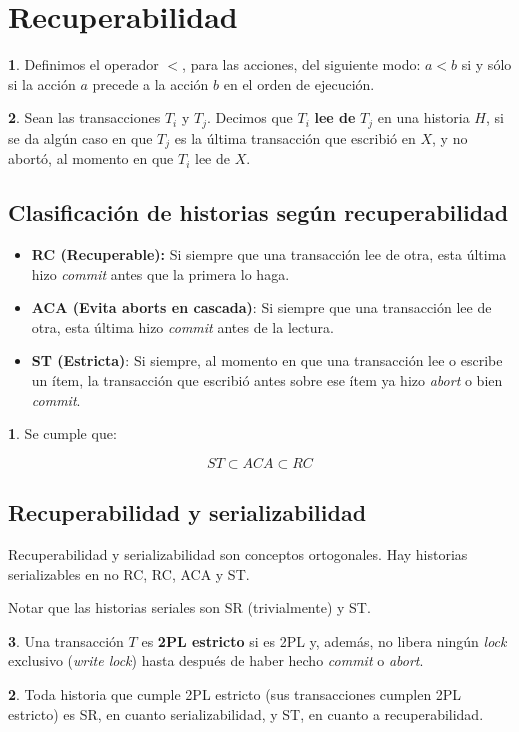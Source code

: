 \documentclass[english,titlepage]{article}
\theoremstyle{definition}
\theoremstyle{definition}
\newtheorem*{defn*}{\protect\definitionname}
\providecommand{\definitionname}{Definición}
\newtheorem*{thm*}{\protect\theoremname}
\providecommand{\theoremname}{Teorema}
\begin{document}
\section{Recuperabilidad}

\begin{defn*}
Definimos el operador $<$, para las acciones, del siguiente modo:
$a < b$ si y sólo si la acción $a$ precede a la acción $b$ en el orden de
ejecución.
\end{defn*}

\begin{defn*}
Sean las transacciones $T_i$ y $T_j$. Decimos que $T_i$ \textbf{lee de} $T_j$
en una historia $H$, si se da algún caso en que $T_j$ es la última transacción
que escribió en $X$, y no abortó, al momento en que $T_i$ lee de $X$.
\end{defn*}

\subsection{Clasificación de historias según recuperabilidad}
\begin{itemize}
	\item \textbf{RC (Recuperable):} Si siempre que una transacción lee de
        otra, esta última hizo \emph{commit} antes que la primera lo haga.
    \item \textbf{ACA (Evita aborts en cascada)}: Si siempre que una
        transacción lee de otra, esta última hizo \emph{commit} antes de la
        lectura.
    \item \textbf{ST (Estricta)}: Si siempre, al momento en que una
        transacción lee o escribe un ítem, la transacción que escribió antes
        sobre ese ítem ya hizo \emph{abort} o bien \emph{commit}.
\end{itemize}

\begin{thm*}
Se cumple que:

$$ ST \subset ACA \subset RC$$
\end{thm*}

\subsection{Recuperabilidad y serializabilidad}

Recuperabilidad y serializabilidad son conceptos ortogonales. Hay historias
serializables en no RC, RC, ACA y ST.

Notar que las historias seriales son SR (trivialmente) y ST.

\begin{defn*}
Una transacción $T$ es \textbf{2PL estricto} si es 2PL y, además, no libera
ningún \emph{lock} exclusivo (\emph{write lock}) hasta después de haber hecho
\emph{commit} o \emph{abort}.
\end{defn*}

\begin{thm*}
Toda historia que cumple 2PL estricto (sus transacciones cumplen 2PL estricto)
es SR, en cuanto serializabilidad, y ST, en cuanto a recuperabilidad.
\end{thm*}
\end{document}
